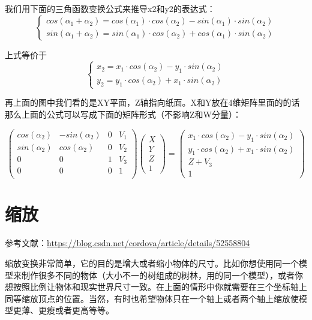 \documentclass[UTF8,a4paper,8pt]{ctexbook}
\begin{document}
		我们用下面的三角函数变换公式来推导x2和y2的表达式：
		$$
			\begin{cases}
				cos(\alpha_1 + \alpha_2) = cos(\alpha_1)\cdot cos(\alpha_2) - sin(\alpha_1)\cdot sin(\alpha_2)\\
				sin(\alpha_1 + \alpha_2) = sin(\alpha_1)\cdot cos(\alpha_2) + cos(\alpha_1)\cdot sin(\alpha_2)
			\end{cases}
		$$
		
		上式等价于
		$$
		\begin{cases}
			x_2 = x_1\cdot cos(\alpha_2) - y_1\cdot sin(\alpha_2)\\
			y_2 = y_1\cdot cos(\alpha_2) + x_1\cdot sin(\alpha_2)
		\end{cases}
		$$
		
		
		再上面的图中我们看的是XY平面，Z轴指向纸面。X和Y放在4维矩阵里面的的话那么上面的公式可以写成下面的矩阵形式（不影响Z和W分量）：
		
		\begin{equation}
		\left(
		\begin{array}{cccc}
		cos(\alpha_2) & -sin(\alpha_2) & 0& V_1\\
		
		sin(\alpha_2) & cos(\alpha_2) & 0& V_2\\
		
		0 & 0 & 1& V_3\\
		
		0 & 0 & 0& 1\\
		\end{array}
		\right)
		\left(
		\begin{array}{c}
		X\\ 
		Y\\
		Z\\
		1 
		\end{array}	
		\right) 
		=
		\left(
		\begin{array}{c}
		x_1\cdot cos(\alpha_2) - y_1\cdot sin(\alpha_2)\\ 
		y_1\cdot cos(\alpha_2) + x_1\cdot sin(\alpha_2)\\
		Z+V_3\\
		1 
		\end{array}	
		\right)
		\end{equation}
	\section{缩放}
		参考文献：\url{https://blog.csdn.net/cordova/article/details/52558804}

		缩放变换非常简单，它的目的是增大或者缩小物体的尺寸。比如你想使用同一个模型来制作很多不同的物体（大小不一的树组成的树林，用的同一个模型），或者你想按照比例让物体和现实世界尺寸一致。在上面的情形中你就需要在三个坐标轴上同等缩放顶点的位置。当然，有时也希望物体只在一个轴上或者两个轴上缩放使模型更薄、更瘦或者更高等等。
		
\end{document}
